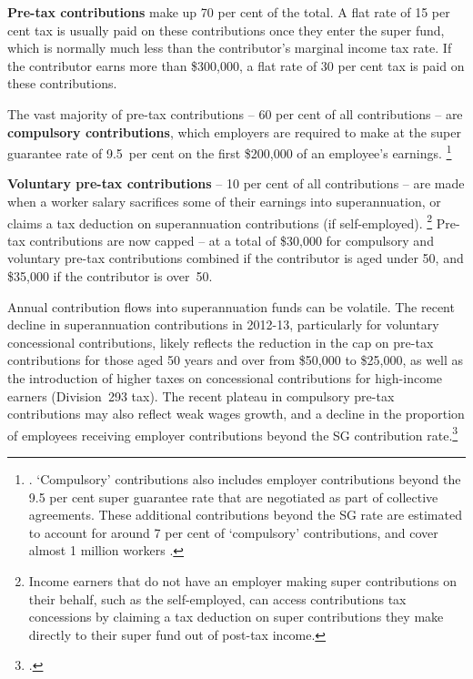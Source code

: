 \textbf{Pre-tax contributions} make up 70 per cent of the total. A flat rate of 15 per cent tax is usually paid on these contributions once they enter the super fund, which is normally much less than the contributor’s marginal income tax rate. If the contributor earns more than \$300,000, a flat rate of 30 per cent tax is paid on these contributions.\enlargethispage{1\baselineskip}  %

The vast majority of pre-tax contributions – 60 per cent of all contributions – are \textbf{compulsory contributions}, which employers are required to make at the super guarantee rate of 9.5~per cent on the first \$200,000 of an employee’s earnings.%
\footnote{\textcites{APRA2014}{ATO2015SampleFile1213}{ATO2015MaxSuperContrBase}. `Compulsory' contributions also includes employer contributions beyond the 9.5 per cent super guarantee rate that are negotiated as part of collective agreements. These additional contributions beyond the SG rate are estimated to account for around 7 per cent of ‘compulsory’ contributions, and cover almost 1 million workers \textcite[][16]{Kelly2013}.}  

\textbf{Voluntary pre-tax contributions} – 10 per cent of all contributions – are made when a worker salary sacrifices some of their earnings into superannuation, or claims a tax deduction on superannuation contributions (if self-employed).%
\footnote{Income earners that do not have an employer making super contributions on their behalf, such as the self-employed, can access contributions tax concessions by claiming a tax deduction on super contributions they make directly to their super fund out of post-tax income.}
Pre-tax contributions are now capped – at a total of \$30,000 for compulsory and voluntary pre-tax contributions combined if the contributor is aged under 50, and \$35,000 if the contributor is over~50.

Annual contribution flows into superannuation funds can be volatile. The recent decline in superannuation contributions in 2012-13, particularly for voluntary concessional contributions, likely reflects the reduction in the cap on pre-tax contributions for those aged 50 years and over from \$50,000 to \$25,000, as well as the introduction of higher taxes on concessional contributions for high-income earners (Division~293 tax). The recent plateau in compulsory pre-tax contributions may also reflect weak wages growth, and a decline in the proportion of employees receiving employer contributions beyond the SG contribution rate.\footcite[][15--16]{Kelly2013}

